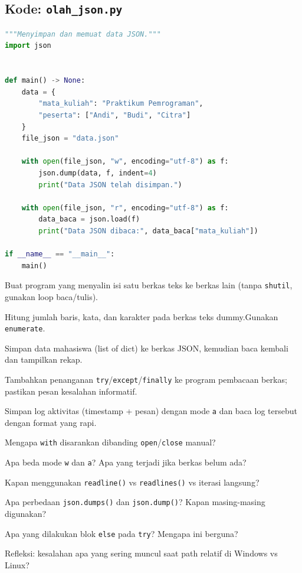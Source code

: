 \documentclass[../main.tex]{subfiles}
\begin{document}
\subsection{Kode: \texttt{olah\_json.py}}
\introstudikasuskode
\begin{lstlisting}[language=Python,caption={\texttt{olah\_json.py}}]
"""Menyimpan dan memuat data JSON."""
import json


def main() -> None:
    data = {
        "mata_kuliah": "Praktikum Pemrograman",
        "peserta": ["Andi", "Budi", "Citra"]
    }
    file_json = "data.json"
    
    with open(file_json, "w", encoding="utf-8") as f:
        json.dump(data, f, indent=4)
        print("Data JSON telah disimpan.")
        
    with open(file_json, "r", encoding="utf-8") as f:
        data_baca = json.load(f)
        print("Data JSON dibaca:", data_baca["mata_kuliah"])

if __name__ == "__main__":
    main()
\end{lstlisting}

\begin{aktivitas}
  \item Buat program yang menyalin isi satu berkas teks ke berkas lain (tanpa \texttt{shutil}, gunakan loop baca/tulis).
  \item Hitung jumlah baris, kata, dan karakter pada berkas teks dummy.\newline Gunakan \texttt{enumerate}.
  \item Simpan data mahasiswa (list of dict) ke berkas JSON, kemudian baca kembali dan tampilkan rekap.
  \item Tambahkan penanganan \texttt{try}/\texttt{except}/\texttt{finally} ke program pembacaan berkas; pastikan pesan kesalahan informatif.
  \item Simpan log aktivitas (timestamp + pesan) dengan mode \texttt{a} dan baca log tersebut dengan format yang rapi.
\end{aktivitas}

\begin{latihan}
  \item Mengapa \texttt{with} disarankan dibanding \texttt{open}/\texttt{close} manual?
  \item Apa beda mode \texttt{w} dan \texttt{a}? Apa yang terjadi jika berkas belum ada?
  \item Kapan menggunakan \texttt{readline()} vs \texttt{readlines()} vs iterasi langsung?
  \item Apa perbedaan \texttt{json.dumps()} dan \texttt{json.dump()}? Kapan masing-masing digunakan?
  \item Apa yang dilakukan blok \texttt{else} pada \texttt{try}? Mengapa ini berguna?
  \item Refleksi: kesalahan apa yang sering muncul saat path relatif di Windows vs Linux?
\end{latihan}
\end{document}
